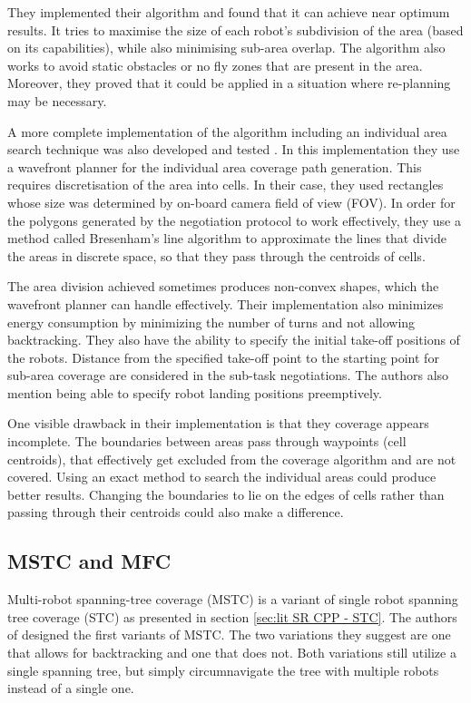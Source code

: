 They implemented their algorithm and found that it can achieve near optimum results. It tries to maximise the size of each robot's subdivision of the area (based on its capabilities), while also minimising sub-area overlap. The algorithm also works to avoid static obstacles or no fly zones that are present in the area. Moreover, they proved that it could be applied in a situation where re-planning may be necessary.

A more complete implementation of the algorithm including an individual area search technique was also developed and tested \cite{Barrientos2011}. In this implementation they use a wavefront planner for the individual area coverage path generation. This requires discretisation of the area into cells. In their case, they used rectangles whose size was determined by on-board camera field of view (FOV). In order for the polygons generated by the negotiation protocol to work effectively, they use a method called Bresenham's line algorithm to approximate the lines that divide the areas in discrete space, so that they pass through the centroids of cells.

The area division achieved sometimes produces non-convex shapes, which the wavefront planner can handle effectively. Their implementation also minimizes energy consumption by minimizing the number of turns and not allowing backtracking. They also have the ability to specify the initial take-off positions of the robots. Distance from the specified take-off point to the starting point for sub-area coverage are considered in the sub-task negotiations. The authors also mention being able to specify robot landing positions preemptively.

One visible drawback in their implementation is that they coverage appears incomplete. The boundaries between areas pass through waypoints (cell centroids), that effectively get excluded from the coverage algorithm and are not covered. Using an exact method to search the individual areas could produce better results. Changing the boundaries to lie on the edges of cells rather than passing through their centroids could also make a difference.

\subsection{MSTC and MFC} 
Multi-robot spanning-tree coverage (MSTC) is a variant of single robot spanning tree coverage (STC) as presented in section \ref{sec:lit SR CPP - STC}. The authors of \cite{Hazon2005} designed the first variants of MSTC. The two variations they suggest are one that allows for backtracking and one that does not. Both variations still utilize a single spanning tree, but simply circumnavigate the tree with multiple robots instead of a single one.

